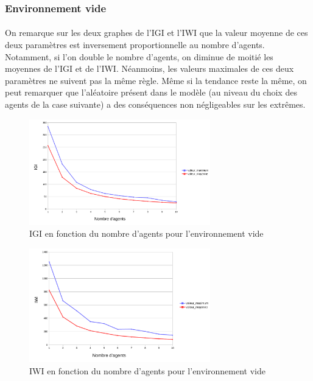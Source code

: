 \documentclass{article}
\begin{document}
        \subsubsection{Environnement vide}
            \paragraph{} On remarque sur les deux graphes de l'IGI et l'IWI que la valeur moyenne de ces deux paramètres est inversement proportionnelle au nombre d'agents.
            Notamment, si l'on double le nombre d'agents, on diminue de moitié les moyennes de l'IGI et de l'IWI. Néanmoins, les valeurs maximales de ces deux paramètres ne suivent pas la même règle.
            Même si la tendance reste la même, on peut remarquer que l'aléatoire présent dans le modèle (au niveau du choix des agents de la case suivante) a des conséquences non négligeables sur les
            extrêmes.
            \begin{figure}[!h]
                \begin{center}
                    \includegraphics[width = 0.7\textwidth]{graphes pdf/variance tortues IGI.pdf}
                    \caption{IGI en fonction du nombre d'agents pour l'environnement vide}
                \end{center}
            \end{figure}
            \begin{figure}[!h]
                \begin{center}
                    \includegraphics[width = 0.7\textwidth]{graphes pdf/variance tortues IWI.pdf}
                    \caption{IWI en fonction du nombre d'agents pour l'environnement vide}
                \end{center}
            \end{figure}
            \newpage
\end{document}
